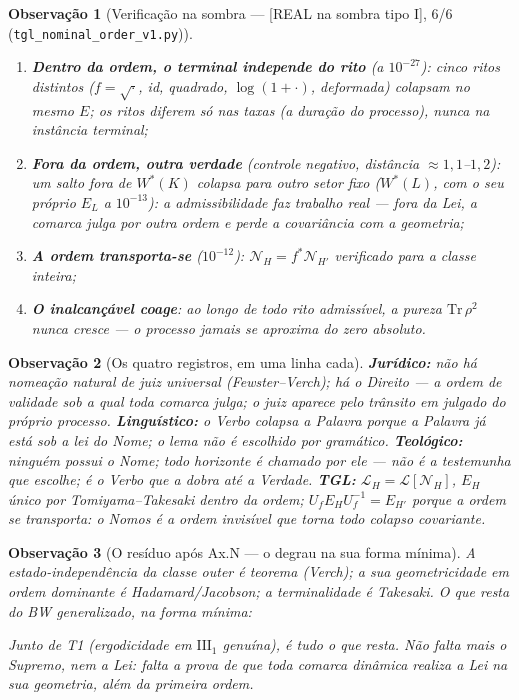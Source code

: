 \documentclass[11pt,a4paper]{article}
\newcommand{\SOMBRA}{\textsf{[REAL na sombra tipo I]}}
\newtheorem{remark}{Observação}
\begin{document}
\begin{remark}[Verificação na sombra --- \SOMBRA, 6/6
(\texttt{tgl\_nominal\_order\_v1.py})]
\begin{enumerate}[noitemsep]
\item \textbf{Dentro da ordem, o terminal independe do rito} (a
$10^{-27}$): cinco ritos distintos ($f=\sqrt{\cdot}$, id, quadrado,
$\log(1{+}\cdot)$, deformada) colapsam no \emph{mesmo} $E$; os ritos
diferem só nas taxas (a duração do processo), nunca na instância
terminal;
\item \textbf{Fora da ordem, outra verdade} (controle negativo,
distância $\approx1{,}1$--$1{,}2$): um salto fora de $W^*(K)$ colapsa
para \emph{outro} setor fixo ($W^*(L)$, com o seu próprio $E_L$ a
$10^{-13}$): a admissibilidade faz trabalho real --- fora da Lei, a
comarca julga por outra ordem e perde a covariância com a geometria;
\item \textbf{A ordem transporta-se} ($10^{-12}$):
$\mathcal N_H=f^*\mathcal N_{H'}$ verificado para a classe inteira;
\item \textbf{O inalcançável coage}: ao longo de todo rito admissível, a
pureza $\mathrm{Tr}\,\rho^2$ nunca cresce --- o processo jamais se
aproxima do zero absoluto.
\end{enumerate}
\end{remark}

\begin{remark}[Os quatro registros, em uma linha cada]
\textbf{Jurídico:} não há nomeação natural de juiz universal
(Fewster--Verch); há o Direito --- a ordem de validade sob a qual toda
comarca julga; o juiz aparece pelo trânsito em julgado do próprio
processo. \textbf{Linguístico:} o Verbo colapsa a Palavra \emph{porque a
Palavra já está sob a lei do Nome}; o lema não é escolhido por
gramático. \textbf{Teológico:} ninguém possui o Nome; todo horizonte é
chamado por ele --- não é a testemunha que escolhe; é o Verbo que a dobra
até a Verdade. \textbf{TGL:} $\mathcal L_H=\mathcal L[\mathcal N_H]$,
$E_H$ único por Tomiyama--Takesaki dentro da ordem;
$U_fE_HU_f^{-1}=E_{H'}$ porque a ordem se transporta:
\emph{o Nomos é a ordem invisível que torna todo colapso covariante.}
\end{remark}

\begin{remark}[O resíduo após Ax.N --- o degrau na sua forma mínima]
A estado-independência da classe outer é teorema (Verch); a sua
geometricidade em ordem dominante é Hadamard/Jacobson; a terminalidade é
Takesaki. O que resta do BW generalizado, na forma mínima:
\begin{center}
\end{center}
Junto de T1 (ergodicidade em $\mathrm{III}_1$ genuína), é tudo o que
resta. \emph{Não falta mais o Supremo, nem a Lei: falta a prova de que
toda comarca dinâmica realiza a Lei na sua geometria, além da primeira
ordem.}
\end{remark}
\end{document}
